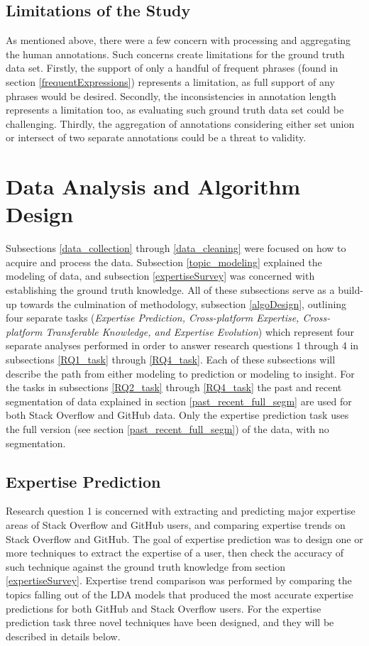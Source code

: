         \subsection{Limitations of the Study}
            As mentioned above, there were a few concern with processing and aggregating the human annotations. Such concerns create limitations for the ground truth data set. Firstly, the support of only a handful of frequent phrases (found in section \ref{frequentExpressions}) represents a limitation, as full support of any phrases would be desired. Secondly, the inconsistencies in annotation length represents a limitation too, as evaluating such ground truth data set could be challenging. Thirdly, the aggregation of annotations considering either set union or intersect of two separate annotations could be a threat to validity. 
        
\section{Data Analysis and Algorithm Design\label{algoDesign}}

    Subsections \ref{data_collection} through \ref{data_cleaning} were focused on how to acquire and process the data. Subsection \ref{topic_modeling} explained the modeling of data, and subsection \ref{expertiseSurvey} was concerned with establishing the ground truth knowledge. All of these subsections serve as a build-up towards the culmination of methodology, subsection \ref{algoDesign}, outlining four separate tasks (\emph{Expertise Prediction, Cross-platform Expertise, Cross-platform Transferable Knowledge, and Expertise Evolution}) which represent four separate analyses performed in order to answer research questions 1 through 4 in subsections \ref{RQ1_task} through \ref{RQ4_task}. Each of these subsections will describe the path from either modeling to prediction or modeling to insight. For the tasks in subsections \ref{RQ2_task} through \ref{RQ4_task} the past and recent segmentation of data explained in section \ref{past_recent_full_segm} are used for both Stack Overflow and GitHub data. Only the expertise prediction task uses the full version (see section \ref{past_recent_full_segm}) of the data, with no segmentation. 
    
    \subsection{Expertise Prediction\label{RQ1_task}}
        Research question 1 is concerned with extracting and predicting major expertise areas of Stack Overflow and GitHub users, and comparing expertise trends on Stack Overflow and GitHub. The goal of expertise prediction was to design one or more techniques to extract the expertise of a user, then check the accuracy of such technique against the ground truth knowledge from section \ref{expertiseSurvey}. Expertise trend comparison was performed by comparing the topics falling out of the LDA models that produced the most accurate expertise predictions for both GitHub and Stack Overflow users. For the expertise prediction task three novel techniques have been designed, and they will be described in details below. 
        

